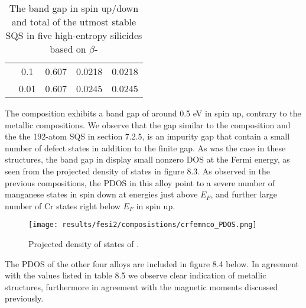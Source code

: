 \begin{table}[H]
\begin{tabular}{@{}ccccc@{}}
\multicolumn{1}{c|}{}                             & \multicolumn{1}{c|}{0.1}  & 0.607                                                                         & 0.0218                                                                        & 0.0218                                                                         \\
\multicolumn{1}{c|}{}                             & \multicolumn{1}{c|}{0.01}                      & 0.607                                                                         & 0.0245                                                                        & 0.0245                                                                         \\ \bottomrule
\end{tabular}
\caption{The band gap in spin up/down and total of the utmost stable SQS in five high-entropy silicides based on $\beta$-}
\end{table}
 
The  composition exhibits a band gap of around 0.5 eV in spin up, contrary to the metallic compositions. We observe that the gap similar to the  composition and the the 192-atom SQS in section 7.2.5, is an impurity gap that contain a small number of defect states in addition to the finite gap. As was the case in these structures, the band gap in  display small nonzero DOS at the Fermi energy, as seen from the projected density of states in figure 8.3. As observed in the previous compositions, the PDOS in this alloy point to a severe number of manganese states in spin down at energies just above $E_F$, and further large number of Cr states right below $E_F$ in spin up.  
  
\begin{figure}[H]
\centering
\texttt{[image: results/fesi2/composistions/crfemnco\_PDOS.png]}
\caption{Projected density of states of .}
\end{figure}

The PDOS of the other four alloys are included in figure 8.4 below. In agreement with the values listed in table 8.5 we observe clear indication of metallic structures, furthermore in agreement with the magnetic moments discussed previously. 

